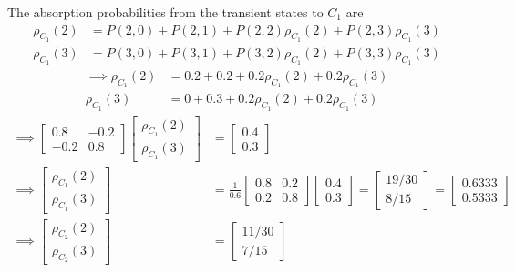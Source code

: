 The absorption probabilities from the transient states to \( C_1 \) are
\begin{align*}
    \rho_{C_1} (2)
     & =
    P(2, 0) + P(2, 1) + P(2, 2) \rho_{C_1} (2) + P(2, 3) \rho_{C_1} (3)
    \\
    \rho_{C_1} (3)
     & =
    P(3, 0) + P(3, 1) + P(3, 2) \rho_{C_1} (2) + P(3, 3) \rho_{C_1} (3)
\end{align*}
\begin{align*}
    \implies
    \rho_{C_1} (2)
     & =
    0.2 + 0.2 + 0.2 \rho_{C_1} (2) + 0.2 \rho_{C_1} (3)
    \\
    \rho_{C_1} (3)
     & =
    0 + 0.3 + 0.2 \rho_{C_1} (2) + 0.2 \rho_{C_1} (3)
\end{align*}
\begin{align*}
    \implies
    \begin{bmatrix}
        0.8  & -0.2 \\
        -0.2 & 0.8
    \end{bmatrix}
    \begin{bmatrix}
        \rho_{C_1} (2) \\
        \rho_{C_1} (3)
    \end{bmatrix}
     & =
    \begin{bmatrix}
        0.4 \\
        0.3
    \end{bmatrix}
    \\
    \implies
    \begin{bmatrix}
        \rho_{C_1} (2) \\
        \rho_{C_1} (3)
    \end{bmatrix}
     & =
    \frac{1}{0.6}
    \begin{bmatrix}
        0.8 & 0.2 \\
        0.2 & 0.8
    \end{bmatrix}
    \begin{bmatrix}
        0.4 \\
        0.3
    \end{bmatrix}
    =
    \begin{bmatrix}
        19/30 \\
        8/15
    \end{bmatrix}
    =
    \begin{bmatrix}
        0.6333 \\
        0.5333
    \end{bmatrix}
    \\
    \implies
    \begin{bmatrix}
        \rho_{C_2} (2) \\
        \rho_{C_2} (3)
    \end{bmatrix}
     & =
    \begin{bmatrix}
        11/30 \\
        7/15
    \end{bmatrix}
\end{align*}
